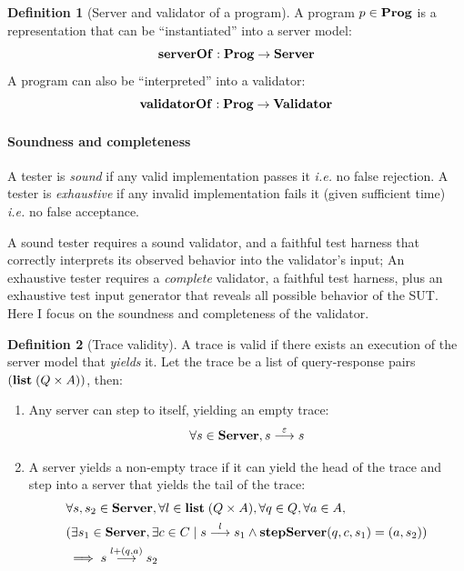 \documentclass{article}
\theoremstyle{definition}
\newtheorem{definition}{Definition}
\newcommand{\Server}{\ottkw{Server}}
\newcommand{\Validator}{\ottkw{Validator}}
\newcommand{\stepServer}{\ottkw{stepServer}}
\newcommand{\List}{\ottkw{list}\;}
\newcommand{\nil}{\varepsilon}
\newcommand{\yields}[3]{#1\overset{#2}{\longrightarrow}#3}
\newcommand{\Prog}{\ottkw{Prog}}
\newcommand{\serverOf}{\ottkw{serverOf}}
\newcommand{\validatorOf}{\ottkw{validatorOf}}
\begin{document}
\begin{definition}[Server and validator of a program]
  A program $p\in\Prog$ is a representation that can be ``instantiated'' into a
  server model:
  \[ \serverOf:\Prog\to\Server \]
  A program can also be ``interpreted'' into a validator:
  \[ \validatorOf:\Prog\to\Validator \]
\end{definition}

\paragraph{Soundness and completeness}
A tester is {\em sound} if any valid implementation passes it {\it i.e.} no
false rejection.  A tester is {\em exhaustive} if any invalid implementation
fails it (given sufficient time) {\it i.e.} no false acceptance.

A sound tester requires a sound validator, and a faithful test harness
that correctly interprets its observed behavior into the validator's input; An
exhaustive tester requires a {\em complete} validator, a faithful test harness,
plus an exhaustive test input generator that reveals all possible behavior of
the SUT.  Here I focus on the soundness and completeness of the validator.

\begin{definition}[Trace validity]
  A trace is valid if there exists an execution of the server model that {\em
    yields} it.  Let the trace be a list of query-response pairs $(\List
  (Q\times A))$, then:
  \begin{enumerate}
  \item Any server can step to itself, yielding an empty trace:
    \[\forall s\in\Server, \yields{s}{\nil}{s}\]
  \item A server yields a non-empty trace if it can yield the head of the trace
    and step into a server that yields the tail of the trace:
    \begin{align*}
      &\forall s,s_2\in\Server,\forall l\in\List(Q\times A),\forall q\in Q,\forall a\in A,\\
      &(\exists s_1\in\Server,\exists c\in C\mid\yields{s}{l}{s_1}\wedge
      \stepServer(q,c,s_1)=(a,s_2)) \\
      &\implies \yields{s}{l+(q,a)}{s_2}
    \end{align*}
  \end{enumerate}
\end{definition}
\end{document}

